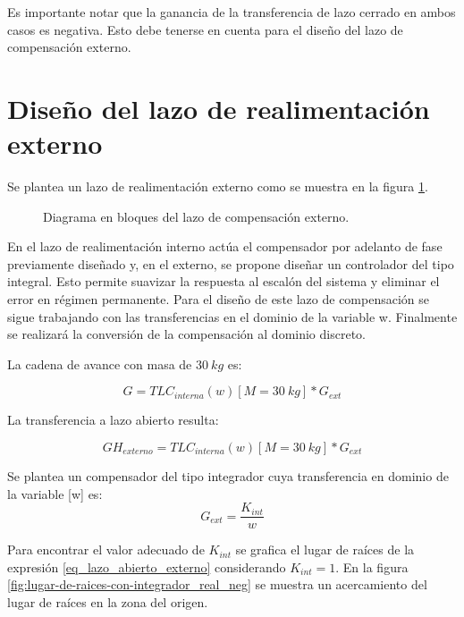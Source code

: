 Es importante notar que la ganancia de la transferencia de lazo cerrado en ambos casos es negativa. Esto debe tenerse en cuenta para el diseño del lazo de compensación externo.





\section{Diseño del lazo de realimentación externo}

\noindent Se plantea un lazo de realimentación externo como se muestra en la figura \ref{fig:diag-externo_dig}. 

\begin{figure}[H]
	\centering
	
	\caption{Diagrama en bloques del lazo de compensación externo.}	\label{fig:diag-externo_dig}
\end{figure}

En el lazo de realimentación interno actúa el compensador por adelanto de fase previamente diseñado y, en el externo, se propone diseñar un controlador del tipo integral. Esto permite suavizar la respuesta al escalón del sistema y eliminar el error en régimen permanente. Para el diseño de este lazo de compensación se sigue trabajando con las transferencias en el dominio de la variable w. Finalmente se realizará la conversión de la compensación al dominio discreto.



\noindent La cadena de avance con masa de $30\:kg$ es:

\begin{equation} \label{eq_cadena_avance_integrador_dig}
	G=TLC_{interna}(w)[M=30\:kg]*G_{ext}
\end{equation}

La transferencia a lazo abierto resulta:

\begin{equation} \label{eq_lazo_abierto_externo_dig}
	GH_{externo}=TLC_{interna}(w)[M=30\:kg]*G_{ext}
\end{equation}

Se plantea un compensador del tipo integrador cuya transferencia en dominio de la variable [w] es:
\begin{equation}
	G_{ext}= \frac{K_{int}}{w}
\end{equation}


Para encontrar el valor adecuado de $K_{int}$ se grafica el lugar de raíces de la expresión \ref{eq_lazo_abierto_externo} considerando $K_{int}=1$. En la figura \ref{fig:lugar-de-raices-con-integrador_real_neg} se muestra un acercamiento del lugar de raíces en la zona del origen.



